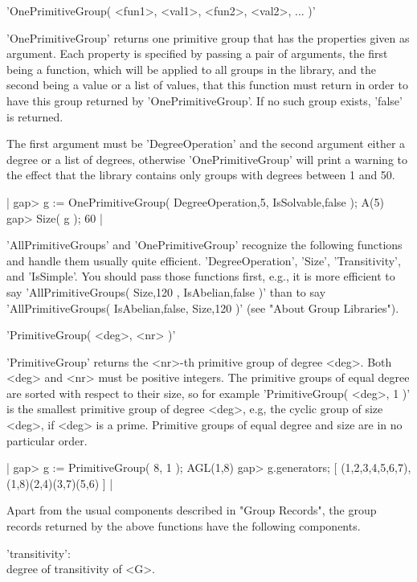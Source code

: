 \vspace{5mm}
'OnePrimitiveGroup( <fun1>, <val1>, <fun2>, <val2>, ... )'%

'OnePrimitiveGroup'  returns one primitive  group that has the properties
given  as  argument.  Each property  is specified  by passing  a pair  of
arguments,  the  first  being  a function, which will  be applied to  all
groups in the library, and the second being a value  or a list of values,
that this function must  return in order to  have this group  returned by
'OnePrimitiveGroup'.  If no such group exists, 'false' is returned.

The  first  argument  must  be 'DegreeOperation'  and the second argument
either a degree or a list of degrees,  otherwise 'OnePrimitiveGroup' will
print a warning to the  effect that the library contains only groups with
degrees between 1 and 50.

|    gap> g := OnePrimitiveGroup( DegreeOperation,5, IsSolvable,false );
    A(5)
    gap> Size( g );
    60 |

'AllPrimitiveGroups'  and  'OnePrimitiveGroup'  recognize  the  following
functions  and handle  them usually quite efficient.   'DegreeOperation',
'Size', 'Transitivity', and 'IsSimple'.  You should  pass those functions
first, e.g., it  is more efficient to say 'AllPrimitiveGroups( Size,120 ,
IsAbelian,false  )' than  to  say  'AllPrimitiveGroups(  IsAbelian,false,
Size,120 )' (see "About Group Libraries").

\vspace{5mm}
'PrimitiveGroup( <deg>, <nr> )'%

'PrimitiveGroup' returns the  <nr>-th  primitive group  of degree  <deg>.
Both  <deg> and <nr> must be positive integers.  The primitive  groups of
equal degree are  sorted  with respect to  their  size,  so  for  example
'PrimitiveGroup( <deg>, 1  )' is  the smallest primitive group  of degree
<deg>,  e.g,  the  cyclic  group  of size  <deg>,  if  <deg> is a  prime.
Primitive groups of equal degree and size are in no particular order.

|    gap>  g := PrimitiveGroup( 8, 1 );
    AGL(1,8)
    gap> g.generators;
    [ (1,2,3,4,5,6,7), (1,8)(2,4)(3,7)(5,6) ] |

Apart from the usual components described in  "Group Records", the  group
records returned by the above functions have the following components.

'transitivity': \\
        degree of transitivity of <G>.

